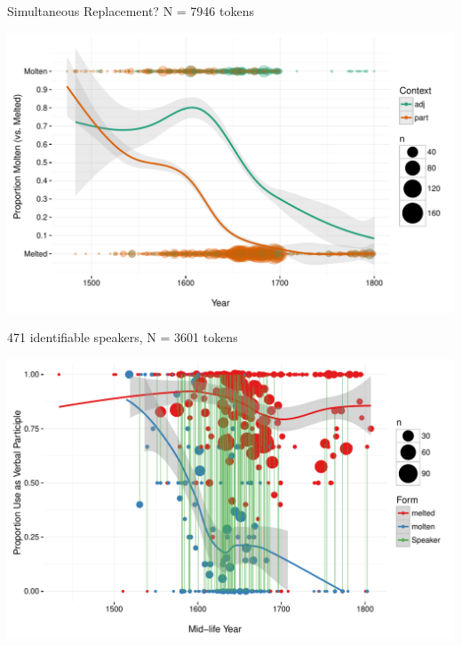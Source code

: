 \documentclass[hyperref={pdfpagelabels=false}]{beamer}
\begin{document}
\begin{frame}{Simultaneous Replacement? N =  7946 tokens}

\includegraphics[width=1.128\textwidth]{FormByDateUnbinnedWithDots2.pdf}
\end{frame}




\begin{frame}{471 identifiable speakers, N = 3601 tokens}

\includegraphics[width=1.128\textwidth]{ContextByDateAuthor.pdf}
\end{frame}
\end{document}
